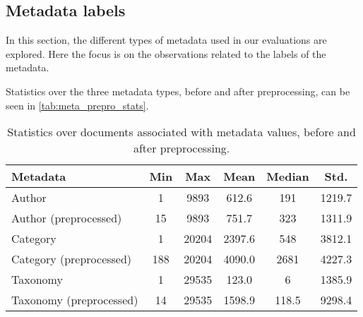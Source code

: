 \subsection{Metadata labels}\label{sec:appendix_meta_data}
In this section, the different types of metadata used in our evaluations are explored. 
Here the focus is on the observations related to the labels of the metadata.





Statistics over the three metadata types, before and after preprocessing, can be seen in \autoref{tab:meta_prepro_stats}.

\begin{table}[b]
	\caption{Statistics over documents associated with metadata values, before and after preprocessing.}
	\label{tab:meta_prepro_stats}
	\centering
	\begin{tabular}{l | c | c | c | c | c}
		Metadata & Min & Max & Mean & Median & Std. \\
		\midrule
		Author & 1 & 9893 & 612.6 & 191 & 1219.7 \\
		Author (preprocessed) & 15 & 9893 & 751.7 & 323 & 1311.9 \\
		Category & 1 & 20204 & 2397.6 & 548 & 3812.1 \\
		Category (preprocessed) & 188 & 20204 & 4090.0 & 2681 & 4227.3 \\
		Taxonomy & 1 & 29535 & 123.0 & 6 & 1385.9 \\
		Taxonomy (preprocessed) & 14 & 29535 & 1598.9 & 118.5 & 9298.4 \\
	\end{tabular}
\end{table}
